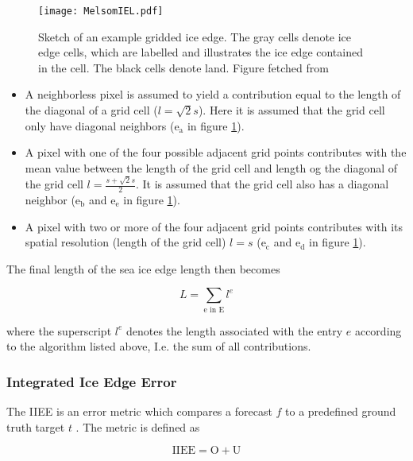 \documentclass[../main/thesis.tex]{subfiles}
\begin{document}
\begin{figure}
    \centering
    \texttt{[image: MelsomIEL.pdf]}
    \caption{\label{fig:iceedgeschematic}Sketch of an example gridded ice edge. The gray cells denote ice edge cells, which are labelled and illustrates the ice edge contained in the cell. The black cells denote land. Figure fetched from \protect\citep{Melsom2019}}
\end{figure}

\begin{itemize}
    \item A neighborless pixel is assumed to yield a contribution equal to the length of the diagonal of a grid cell ($l = \sqrt2s$). Here it is assumed that the grid cell only have diagonal neighbors ($\text{e}_\text{a}$ in figure \ref{fig:iceedgeschematic}).
    \item A pixel with one of the four possible adjacent grid points contributes with the mean value between the length of the grid cell and length og the diagonal of the grid cell $l = \frac{s + \sqrt2s}{2}$. It is assumed that the grid cell also has a diagonal neighbor ($\text{e}_\text{b}$ and $\text{e}_\text{e}$ in figure \ref{fig:iceedgeschematic}).
    \item A pixel with two or more of the four adjacent grid points contributes with its spatial resolution (length of the grid cell) $l = s$ ($\text{e}_\text{c}$ and $\text{e}_\text{d}$ in figure \ref{fig:iceedgeschematic}).
\end{itemize}

The final length of the sea ice edge length then becomes

\begin{equation}
    L = \sum_\text{e in E} l^e
\end{equation}

where the superscript $l^e$ denotes the length associated with the entry $e$ according to the algorithm listed above, I.e. the sum of all contributions.

\subsubsection{Integrated Ice Edge Error}
\label{sec:iiee}
The IIEE is an error metric which compares a forecast $f$ to a predefined ground truth target $t$ \citet{Goessling2016}. The metric is defined as

\begin{equation}
    \label{eq:IIEE}
    \text{IIEE} = \text{O} + \text{U}
\end{equation}
\end{document}
